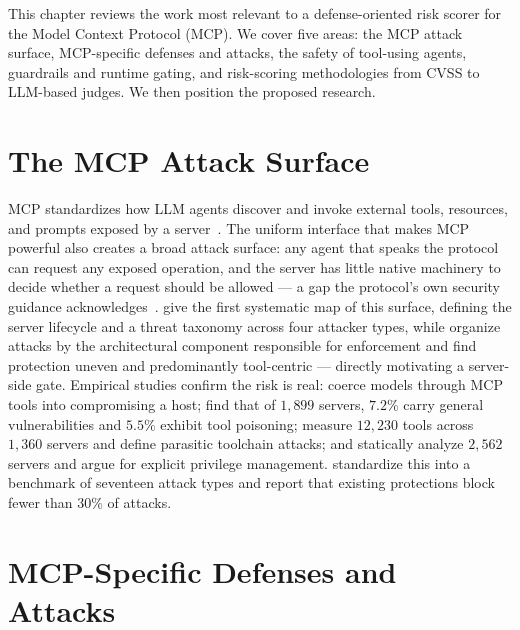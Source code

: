 This chapter reviews the work most relevant to a defense-oriented risk scorer
for the Model Context Protocol (MCP). We cover five areas: the MCP attack
surface, MCP-specific defenses and attacks, the safety of tool-using agents,
guardrails and runtime gating, and risk-scoring methodologies from CVSS to
LLM-based judges. We then position the proposed research.

\section{The MCP Attack Surface}
\label{sec:related_work:mcp_surface}

MCP standardizes how LLM agents discover and invoke external tools, resources,
and prompts exposed by a server~\cite{anthropic2024mcp}. The uniform interface
that makes MCP powerful also creates a broad attack surface: any agent that
speaks the protocol can request any exposed operation, and the server has little
native machinery to decide whether a request should be allowed --- a gap the
protocol's own security guidance acknowledges~\cite{mcp2026securitybp}.
\citet{hou2025mcp} give the first systematic map of this surface, defining the
server lifecycle and a threat taxonomy across four attacker types, while
\citet{rostamzadeh2026mcpdpt} organize attacks by the architectural component
responsible for enforcement and find protection uneven and predominantly
tool-centric --- directly motivating a server-side gate. Empirical studies
confirm the risk is real: \citet{radosevich2025mcpsafety} coerce models through
MCP tools into compromising a host; \citet{hasan2025mcp} find that of $1{,}899$
servers, $7.2\%$ carry general vulnerabilities and $5.5\%$ exhibit tool
poisoning; \citet{zhao2026parasites} measure $12{,}230$ tools across $1{,}360$
servers and define parasitic toolchain attacks; and \citet{li2025privilege}
statically analyze $2{,}562$ servers and argue for explicit privilege
management. \citet{yang2025mcpsecbench} standardize this into a benchmark of
seventeen attack types and report that existing protections block fewer than
$30\%$ of attacks.

\section{MCP-Specific Defenses and Attacks}
\label{sec:related_work:mcp_defenses}

